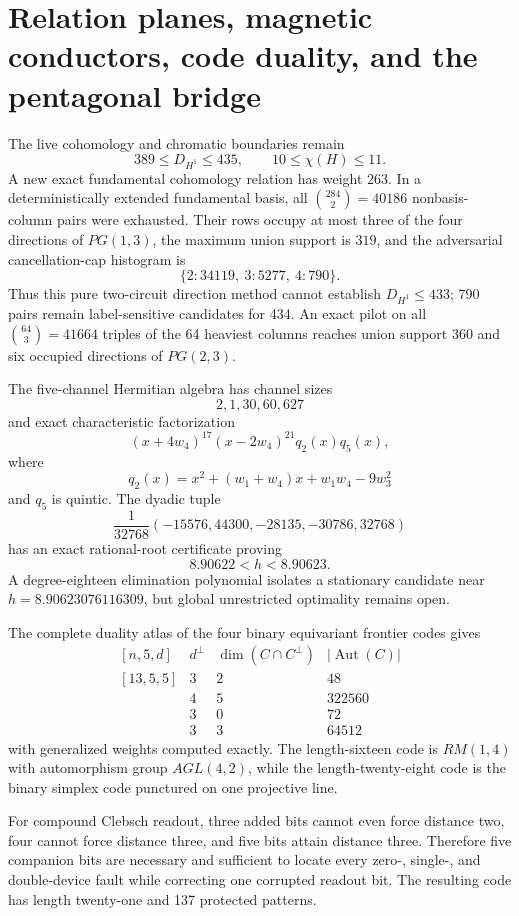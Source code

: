 \section{Relation planes, magnetic conductors, code duality, and the pentagonal bridge}
\label{sec:bt3542-3555}

The live cohomology and chromatic boundaries remain
\[
389\le D_{H^1}\le435,
\qquad
10\le\chi(H)\le11.
\]
A new exact fundamental cohomology relation has weight $263$.  In a
deterministically extended fundamental basis, all $\binom{284}{2}=40186$
nonbasis-column pairs were exhausted.  Their rows occupy at most three of the
four directions of $PG(1,3)$, the maximum union support is $319$, and the
adversarial cancellation-cap histogram is
\[
\{2:34119,\ 3:5277,\ 4:790\}.
\]
Thus this pure two-circuit direction method cannot establish
$D_{H^1}\le433$; 790 pairs remain label-sensitive candidates for 434.  An
exact pilot on all $\binom{64}{3}=41664$ triples of the 64 heaviest columns
reaches union support $360$ and six occupied directions of $PG(2,3)$.

The five-channel Hermitian algebra has channel sizes
\[
2,1,30,60,627
\]
and exact characteristic factorization
\[
(x+4w_4)^{17}(x-2w_4)^{21}q_2(x)q_5(x),
\]
where
\[
q_2(x)=x^2+(w_1+w_4)x+w_1w_4-9w_3^2
\]
and $q_5$ is quintic.  The dyadic tuple
\[
\frac1{32768}(-15576,44300,-28135,-30786,32768)
\]
has an exact rational-root certificate proving
\[
8.90622<h<8.90623.
\]
A degree-eighteen elimination polynomial isolates a stationary candidate near
$h=8.90623076116309$, but global unrestricted optimality remains open.

The complete duality atlas of the four binary equivariant frontier codes gives
\[
\begin{array}{c|c|c|c}
[n,5,d]&d^\perp&\dim(C\cap C^\perp)&|\operatorname{Aut}(C)|\\ \hline
[13,5,5]&3&2&48\\
[16,5,8]&4&5&322560\\
[24,5,11]&3&0&72\\
[28,5,14]&3&3&64512
\end{array}
\]
with generalized weights computed exactly.  The length-sixteen code is
$RM(1,4)$ with automorphism group $AGL(4,2)$, while the length-twenty-eight
code is the binary simplex code punctured on one projective line.

For compound Clebsch readout, three added bits cannot even force distance two,
four cannot force distance three, and five bits attain distance three.
Therefore five companion bits are necessary and sufficient to locate every
zero-, single-, and double-device fault while correcting one corrupted readout
bit.  The resulting code has length twenty-one and 137 protected patterns.

